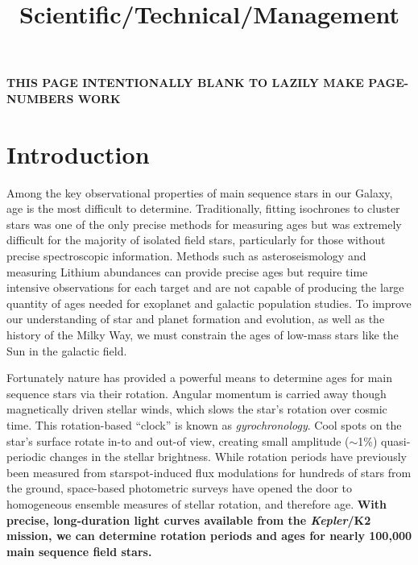 \documentclass[12pt]{article}
\newcommand{\Kepler}{\textsl{Kepler}\xspace}
\begin{document}

{\bf THIS PAGE INTENTIONALLY BLANK TO LAZILY MAKE PAGE-NUMBERS WORK}
\clearpage


\title{\vspace{-0.5in}Scientific/Technical/Management}
\date{}

\maketitle


\vspace{-1in}

\section{Introduction}



Among the key observational properties of main sequence stars in our Galaxy,
age is the most difficult to determine.
Traditionally, fitting isochrones to cluster stars was one of the only precise
methods for measuring ages but was extremely difficult for the majority of
isolated field stars, particularly for those without precise spectroscopic
information.
Methods such as asteroseismology and measuring Lithium abundances can provide
precise ages but require time intensive observations for each target and are
not capable of producing the large quantity of ages needed for exoplanet and
galactic population studies.
To improve our understanding of star and planet formation and evolution, as
well as the history of the Milky Way, we must constrain the ages of
low-mass stars like the Sun in the galactic field.

Fortunately nature has provided a powerful means to determine ages for main
sequence stars via their rotation.
Angular momentum is carried away though magnetically driven stellar winds,
which slows the star's rotation over cosmic time.
This rotation-based ``clock'' is known as {\it gyrochronology}.
Cool spots on the star's surface rotate in-to and out-of view, creating small
amplitude ($\sim$1\%) quasi-periodic changes in the stellar brightness.
While rotation periods have previously been %
measured from
starspot-induced flux modulations for hundreds of stars from the ground,
space-based photometric surveys have opened the door to homogeneous ensemble
measures of stellar rotation, and therefore age.
{\bf With precise, long-duration light curves available from the \Kepler/K2
mission, we can determine rotation periods and ages for nearly 100,000
main sequence field stars.}
\end{document}

